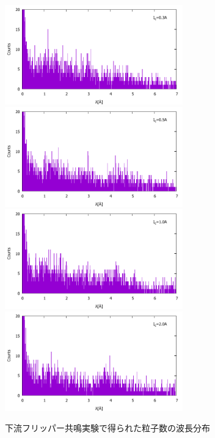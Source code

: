 \begin{figure}[h]
\includegraphics[height=4.3cm]{resonance/results/Flipper2_RawCounts_3A.pdf}\\
\includegraphics[height=4.3cm]{resonance/results/Flipper2_RawCounts_5A.pdf}
\includegraphics[height=4.3cm]{resonance/results/Flipper2_RawCounts_10A.pdf}\\
\includegraphics[height=4.3cm]{resonance/results/Flipper2_RawCounts_20A.pdf}
\caption{下流フリッパー共鳴実験で得られた粒子数の波長分布}\label{Resonance_fig_Flipper2_RawCounts}
\end{figure}

